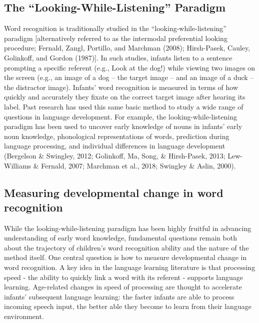\documentclass[
  english,
  man,floatsintext]{apa6}
\begin{document}
\hypertarget{the-looking-while-listening-paradigm}{%
\subsection{The ``Looking-While-Listening'' Paradigm}\label{the-looking-while-listening-paradigm}}

Word recognition is traditionally studied in the ``looking-while-listening'' paradigm {[}alternatively referred to as the intermodal preferential looking procedure; Fernald, Zangl, Portillo, and Marchman (2008); Hirsh-Pasek, Cauley, Golinkoff, and Gordon (1987){]}.
In such studies, infants listen to a sentence prompting a specific referent (e.g., Look at the dog!) while viewing two images on the screen (e.g., an image of a dog -- the target image -- and an image of a duck -- the distractor image).
Infants' word recognition is measured in terms of how quickly and accurately they fixate on the correct target image after hearing its label.
Past research has used this same basic method to study a wide range of questions in language development.
For example, the looking-while-listening paradigm has been used to uncover early knowledge of nouns in infants' early noun knowledge, phonological representations of words, prediction during language processing, and individual differences in language development (Bergelson \& Swingley, 2012; Golinkoff, Ma, Song, \& Hirsh-Pasek, 2013; Lew-Williams \& Fernald, 2007; Marchman et al., 2018; Swingley \& Aslin, 2000).

\hypertarget{measuring-developmental-change-in-word-recognition}{%
\subsection{Measuring developmental change in word recognition}\label{measuring-developmental-change-in-word-recognition}}

While the looking-while-listening paradigm has been highly fruitful in advancing understanding of early word knowledge, fundamental questions remain both about the trajectory of children's word recognition ability and the nature of the method itself.
One central question is how to measure developmental change in word recognition.
A key idea in the language learning literature is that processing speed - the ability to quickly link a word with its referent - supports language learning.
Age-related changes in speed of processing are thought to accelerate infants' subsequent language learning: the faster infants are able to process incoming speech input, the better able they become to learn from their language environment.
\end{document}
